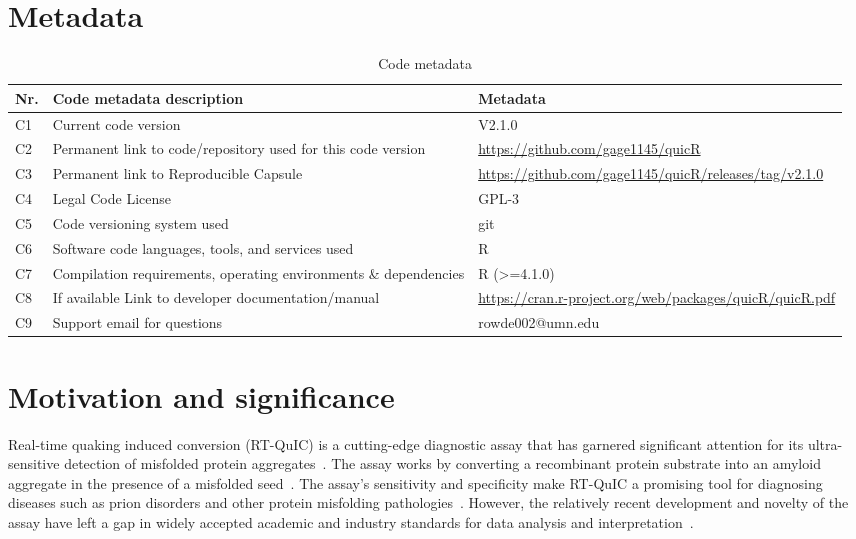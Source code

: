 \documentclass[preprint,12pt, a4paper]{elsarticle}
\begin{document}

\section*{Metadata}

\begin{table}[ht]
    \fontsize{9}{9}\selectfont
    \begin{tabular}{|l|p{6.5cm}|p{6.5cm}|}
        \hline
        \textbf{Nr.} & \textbf{Code metadata description} & \textbf{Metadata} \\
        \hline
        C1 & Current code version & V2.1.0 \\
        \hline
        C2 & Permanent link to code/repository used for this code version & \url{https://github.com/gage1145/quicR} \\
        \hline
        C3  & Permanent link to Reproducible Capsule & \url{https://github.com/gage1145/quicR/releases/tag/v2.1.0}\\
        \hline
        C4 & Legal Code License & GPL-3 \\
        \hline
        C5 & Code versioning system used & git \\
        \hline
        C6 & Software code languages, tools, and services used & R \\
        \hline
        C7 & Compilation requirements, operating environments \& dependencies & R (>=4.1.0) \\
        \hline
        C8 & If available Link to developer documentation/manual & \url{https://cran.r-project.org/web/packages/quicR/quicR.pdf}\\
        \hline
        C9 & Support email for questions & rowde002@umn.edu\\
        \hline
    \end{tabular}
\caption{Code metadata}
\label{codeMetadata} 
\end{table}


\section{Motivation and significance}
    Real-time quaking induced conversion (RT-QuIC) is a cutting-edge diagnostic assay that has garnered significant attention for its ultra-sensitive detection of misfolded protein aggregates~\cite{Wilham2010, Atarashi2011}. The assay works by converting a recombinant protein substrate into an amyloid aggregate in the presence of a misfolded seed~\cite{Wilham2010, Orru2012, Orru2017, Orru2015, Bongianni2019, Dassanayake2016, Hwang2018, Groveman2018, Metrick2020}. The assay's sensitivity and specificity make RT-QuIC a promising tool for diagnosing diseases such as prion disorders and other protein misfolding pathologies~\cite{Fiorini2020, Franceschini2017, Picasso-Risso2022, Holz2021}. However, the relatively recent development and novelty of the assay have left a gap in widely accepted academic and industry standards for data analysis and interpretation~\cite{Rowden2023}.
\end{document}
